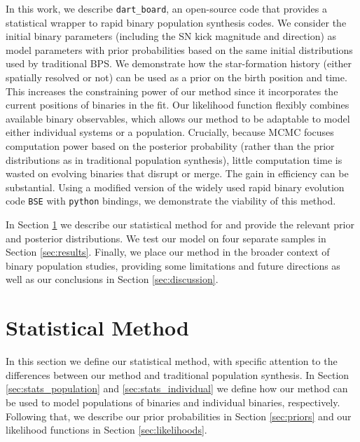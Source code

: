 \documentclass[usenatbib]{mnras}
\newcommand{\dart}{{\tt dart\_board}}
\begin{document}
In this work, we describe \dart, an open-source code that provides a statistical wrapper to rapid binary population synthesis codes. 
We consider the initial binary parameters (including the SN kick magnitude and direction) as model parameters with prior probabilities based on the same initial distributions used by traditional BPS. We demonstrate how the star-formation history (either spatially resolved or not) can be used as a prior on the birth position and time. This increases the constraining power of our method since it incorporates the current positions of binaries in the fit. Our likelihood function flexibly combines available binary observables, which allows our method to be adaptable to model either individual systems or a population. Crucially, because MCMC focuses computation power based on the posterior probability (rather than the prior distributions as in traditional population synthesis), little computation time is wasted on evolving binaries that disrupt or merge. The gain in efficiency can be substantial. Using a modified version of the widely used rapid binary evolution code {\tt BSE} \citep{hurley00,hurley02} with {\tt python} bindings, we demonstrate the viability of this method. 


In Section \ref{sec:stats} we describe our statistical method for and provide the relevant prior and posterior distributions. We test our model on four separate samples in Section \ref{sec:results}. Finally, we place our method in the broader context of binary population studies, providing some limitations and future directions as well as our conclusions in Section \ref{sec:discussion}.








\section{Statistical Method}
\label{sec:stats}

In this section we define our statistical method, with specific attention to the differences between our method and traditional population synthesis. In Section \ref{sec:stats_population} and \ref{sec:stats_individual} we define how our method can be used to model populations of binaries and individual binaries, respectively. Following that, we describe our prior probabilities in Section \ref{sec:priors} and our likelihood functions in Section \ref{sec:likelihoods}.
\end{document}
